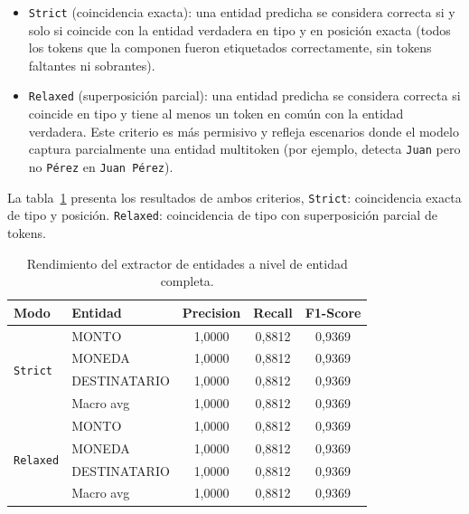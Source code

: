 \begin{itemize}
    \item \texttt{Strict} (coincidencia exacta): una entidad predicha se considera correcta si y solo si coincide con la entidad verdadera en tipo y en posición exacta (todos los tokens que la componen fueron etiquetados correctamente, sin tokens faltantes ni sobrantes).

    \item \texttt{Relaxed} (superposición parcial): una entidad predicha se considera correcta si coincide en tipo y tiene al menos un
    token en común con la entidad verdadera. Este criterio es más permisivo y refleja escenarios donde el modelo captura parcialmente una entidad
    multitoken (por ejemplo, detecta \texttt{Juan} pero no \texttt{Pérez} en \texttt{Juan Pérez}).
\end{itemize}

La tabla~\ref{tab:metricas-ner-entidad} presenta los resultados de ambos criterios, \texttt{Strict}: coincidencia exacta de tipo y posición.
         \texttt{Relaxed}: coincidencia de tipo con superposición parcial de tokens.

\begin{table}[H]
\caption{Rendimiento del extractor de entidades a nivel de entidad completa.}
\centering
\begin{tabular}{@{}ll ccc@{}}
\toprule
\textbf{Modo} & \textbf{Entidad} & \textbf{Precision} & \textbf{Recall} & \textbf{F1-Score} \\
\midrule
\multirow{4}{*}{\texttt{Strict}}
  & MONTO         & 1,0000 & 0,8812 & 0,9369 \\
  & MONEDA        & 1,0000 & 0,8812 & 0,9369 \\
  & DESTINATARIO  & 1,0000 & 0,8812 & 0,9369 \\
  \cmidrule(l){2-5}
  & Macro avg & 1,0000 & 0,8812 & 0,9369 \\
\midrule
\multirow{4}{*}{\texttt{Relaxed}}
  & MONTO         & 1,0000 & 0,8812 & 0,9369 \\
  & MONEDA        & 1,0000 & 0,8812 & 0,9369 \\
  & DESTINATARIO  & 1,0000 & 0,8812 & 0,9369 \\
  \cmidrule(l){2-5}
  & Macro avg & 1,0000 & 0,8812 & 0,9369 \\
\bottomrule
\end{tabular}
\label{tab:metricas-ner-entidad}
\end{table}

